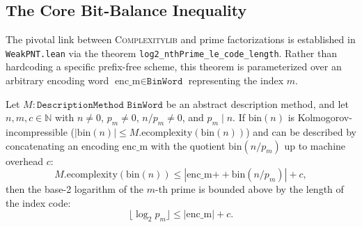 \documentclass[acmsmall,natbib=false,nonacm]{acmart}
\begin{document}
\subsection{The Core Bit-Balance Inequality}
The pivotal link between \textsc{Complexitylib} and prime factorizations is established in \texttt{WeakPNT.lean} via the theorem \texttt{log2\_nthPrime\_le\_code\_length}. Rather than hardcoding a specific prefix-free scheme, this theorem is parameterized over an arbitrary encoding word $\text{enc\_m} \in \texttt{BinWord}$ representing the index $m$.

\begin{theorem}
\label{thm:bit_balance}
Let $M : \texttt{DescriptionMethod BinWord}$ be an abstract description method, and let $n, m, c \in \mathbb{N}$ with $n \neq 0$, $p_m \neq 0$, $n / p_m \neq 0$, and $p_m \mid n$. If $\text{bin}(n)$ is Kolmogorov-incompressible ($|\text{bin}(n)| \le M.\text{ecomplexity}(\text{bin}(n))$) and can be described by concatenating an encoding $\text{enc\_m}$ with the quotient $\text{bin}(n / p_m)$ up to machine overhead $c$:
\begin{equation}
    M.\text{ecomplexity}(\text{bin}(n)) \le |\text{enc\_m} \mathbin{+\!+} \text{bin}(n / p_m)| + c,
\end{equation}
then the base-2 logarithm of the $m$-th prime is bounded above by the length of the index code:
\begin{equation}
    \label{eq:core_bit_balance}
    \lfloor\log_2 p_m\rfloor \le |\text{enc\_m}| + c.
\end{equation}
\end{theorem}
\end{document}
